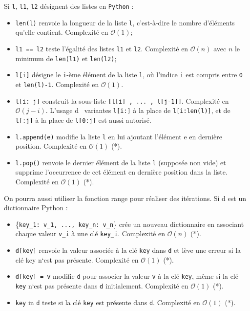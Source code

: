 Si \lstinline{l}, \lstinline{l1}, \lstinline{l2} désignent des listes en \lstinline{Python} : 
\begin{itemize}
\item  \lstinline{len(l)} renvoie la longueur de la liste \lstinline{l}, c'est-à-dire le nombre d'éléments qu'elle contient.
Complexité en $\mathcal{O}(1)$;
\item  \lstinline{l1 == l2} teste l'égalité des listes \lstinline{l1} et \lstinline{l2}. Complexité en $\mathcal{O}(n)$ avec $n$ le minimum de \lstinline{len(l1)} et \lstinline{len(l2)};
\item  \lstinline{l[i]} désigne le \lstinline{i}-ème élément de la liste \lstinline{l}, où l'indice \lstinline{i} est compris entre \lstinline{0} et \lstinline{len(l)-1}. Complexité en $\mathcal{O}(1)$.
\item  \lstinline{l[i: j]} construit la sous-liste \lstinline{[l[i] , ... , l[j-1]]}. Complexité en $\mathcal{O}(j-i)$. L'usage d~
variantes \lstinline{l[i:]} à la place de \lstinline{l[i:len(l)]}, et de \lstinline{l[:j]} à la place de \lstinline{l[0:j]} est aussi
autorisé. 
\item \lstinline{l.append(e)} modifie la liste \lstinline{l} en lui ajoutant l'élément e en dernière position. Complexité
en $\mathcal{O}(1)$ (*).
\item \lstinline{l.pop()} renvoie le dernier élément de la liste \lstinline{l} (supposée non vide) et supprime l'occurrence
de cet élément en dernière position dans la liste. Complexité en $\mathcal{O}(1)$ (*).
\end{itemize} 

On pourra aussi utiliser la fonction range pour réaliser des itérations.
Si d est un dictionnaire Python :
\begin{itemize}
\item \{\lstinline{key_1: v_1, ..., key_n: v_n}\} crée un nouveau dictionnaire en associant chaque valeur
\lstinline{v_i} à une clé \lstinline{key_i}. Complexité en $\mathcal{O}(n)$ (*).
\item \lstinline{d[key]} renvoie la valeur associée à la clé \lstinline{key} dans \lstinline{d} et lève une erreur si la clé key n`est
pas présente. Complexité en $\mathcal{O}(1)$ (*).
\item \lstinline{d[key] = v} modifie \lstinline{d} pour associer la valeur \lstinline{v} à la clé \lstinline{key}, même si la clé \lstinline{key} n`est pas
présente dans \lstinline{d} initialement. Complexité en $\mathcal{O}(1)$ (*).
\item \lstinline{key} in \lstinline{d} teste si la clé \lstinline{key} est présente dans \lstinline{d}. Complexité en $\mathcal{O}(1)$ (*).
\end{itemize}

